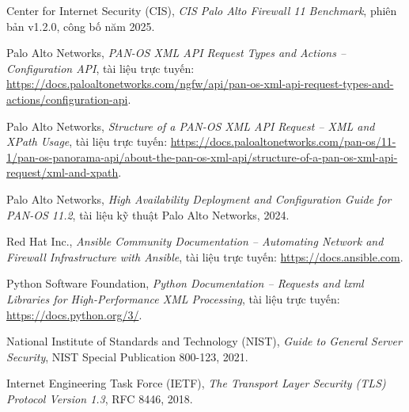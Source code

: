 \documentclass[12pt,a4paper]{article}
\begin{document}
\begin{enumerate}[label={[\arabic*]}]
    \item Center for Internet Security (CIS), \textit{CIS Palo Alto Firewall 11 Benchmark}, phiên bản v1.2.0, công bố năm 2025.
    \item Palo Alto Networks, \textit{PAN-OS XML API Request Types and Actions -- Configuration API}, tài liệu trực tuyến: \url{https://docs.paloaltonetworks.com/ngfw/api/pan-os-xml-api-request-types-and-actions/configuration-api}.
    \item Palo Alto Networks, \textit{Structure of a PAN-OS XML API Request -- XML and XPath Usage}, tài liệu trực tuyến: \url{https://docs.paloaltonetworks.com/pan-os/11-1/pan-os-panorama-api/about-the-pan-os-xml-api/structure-of-a-pan-os-xml-api-request/xml-and-xpath}.
    \item Palo Alto Networks, \textit{High Availability Deployment and Configuration Guide for PAN-OS 11.2}, tài liệu kỹ thuật Palo Alto Networks, 2024.
    \item Red Hat Inc., \textit{Ansible Community Documentation -- Automating Network and Firewall Infrastructure with Ansible}, tài liệu trực tuyến: \url{https://docs.ansible.com}.
    \item Python Software Foundation, \textit{Python Documentation -- Requests and lxml Libraries for High-Performance XML Processing}, tài liệu trực tuyến: \url{https://docs.python.org/3/}.
    \item National Institute of Standards and Technology (NIST), \textit{Guide to General Server Security}, NIST Special Publication 800-123, 2021.
    \item Internet Engineering Task Force (IETF), \textit{The Transport Layer Security (TLS) Protocol Version 1.3}, RFC 8446, 2018.
\end{enumerate}
\end{document}
